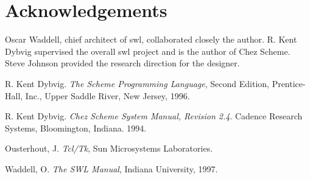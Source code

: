 \documentclass{article}
\begin{document}
\section{Acknowledgements}

Oscar Waddell, chief architect of {\sc swl}, collaborated closely the
author.  R. Kent Dybvig supervised the overall {\sc swl} project and
is the author of Chez Scheme.  Steve Johnson provided the research
direction for the designer.




\begin{thebibliography}{99}

 R. Kent Dybvig. {\em The Scheme Programming Language},
Second Edition, Prentice-Hall, Inc., Upper Saddle River, New Jersey,
1996.

 R. Kent Dybvig.  {\em Chez Scheme System Manual,
Revision 2.4}.  Cadence Research Systems, Bloomington, Indiana. 1994.

 Ousterhout, J. {\em Tcl/Tk}, Sun Microsystems
Laboratories.

 Waddell, O. {\em The SWL Manual}, Indiana University, 1997.



\end{thebibliography}
\end{document}
